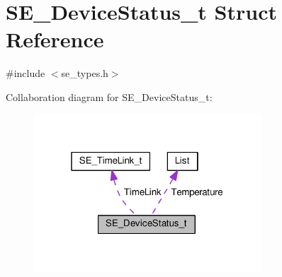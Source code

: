\hypertarget{structSE__DeviceStatus__t}{}\section{S\+E\+\_\+\+Device\+Status\+\_\+t Struct Reference}
\label{structSE__DeviceStatus__t}


{\ttfamily \#include $<$se\+\_\+types.\+h$>$}



Collaboration diagram for S\+E\+\_\+\+Device\+Status\+\_\+t\+:\nopagebreak
\begin{figure}[H]
\begin{center}
\leavevmode
\includegraphics[width=241pt]{structSE__DeviceStatus__t__coll__graph}
\end{center}
\end{figure}
